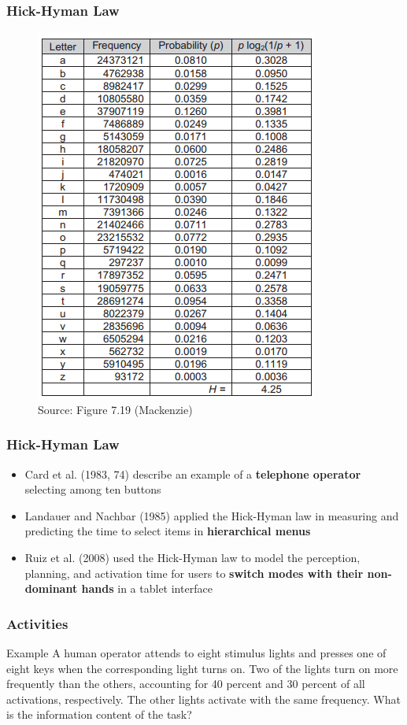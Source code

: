 \documentclass{beamer}
\begin{document}
\begin{frame}
	\frametitle{Hick-Hyman Law}
	\begin{figure}
		\centering
		\includegraphics[width=.4\linewidth]{image/7-19}
		\caption{Source: Figure 7.19 (Mackenzie)}
	\end{figure}
\end{frame}

\begin{frame}
	\frametitle{Hick-Hyman Law}
	\begin{itemize}
		\item Card et al. (1983, 74) describe an example of a \textbf{telephone operator} selecting among ten buttons
		\item Landauer and Nachbar (1985) applied the Hick-Hyman law in measuring and predicting the time to select items in \textbf{hierarchical menus}%
		\item Ruiz et al. (2008) used the Hick-Hyman law to model the perception, planning, and activation time for users to \textbf{switch modes with their non-dominant hands} in a tablet interface
	\end{itemize}
\end{frame}

\begin{frame}
\frametitle{Activities}
\begin{block}{Example}
	\footnotesize
	A human operator attends to eight stimulus lights and presses one of eight keys when the corresponding light turns on. Two of the lights turn on more frequently than the others, accounting for 40 percent and 30 percent of all activations, respectively. The other lights activate with the same frequency. What is the information content of the task?
\end{block}
\end{frame}
\end{document}
